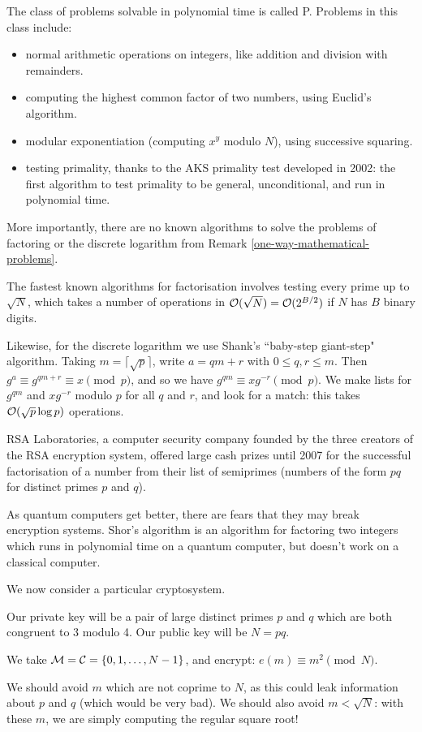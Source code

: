 \documentclass{article}
\begin{document}
\begin{remark}
	\label{polynomial-time-algorithms}
	The class of problems solvable in polynomial time is called P. Problems in this class include:
	\begin{itemize}
		\item normal arithmetic operations on integers, like addition and division with remainders.
		\item computing the highest common factor of two numbers, using Euclid's algorithm.
		\item modular exponentiation (computing $x^y$ modulo $N$), using successive squaring.
		\item testing primality, thanks to the AKS primality test developed in 2002: the first algorithm to test primality to be general, unconditional, and run in polynomial time.
	\end{itemize}
	More importantly, there are no known algorithms to solve the problems of factoring or the discrete logarithm from Remark \ref{one-way-mathematical-problems}.
	
	The fastest known algorithms for factorisation involves testing every prime up to $\sqrt N$, which takes a number of operations in $\mathcal{O}(\sqrt N) = \mathcal{O}(2^{B/2})$ if $N$ has $B$ binary digits.
	
	Likewise, for the discrete logarithm we use Shank's ``baby-step giant-step" algorithm. Taking $m = \lceil \sqrt p \rceil$, write $a = qm + r$ with $0 \leq q, r \leq m$. Then $g^a \equiv g^{qm+r} \equiv x \pmod p$, and so we have $g^{qm} \equiv xg^{-r} \pmod p$. We make lists for $g^{qm}$ and $x g^{-r}$ modulo $p$ for all $q$ and $r$, and look for a match: this takes $\mathcal{O}(\sqrt p \log p)$ operations.
	
	RSA Laboratories, a computer security company founded by the three creators of the RSA encryption system, offered large cash prizes until 2007 for the successful factorisation of a number from their list of semiprimes (numbers of the form $pq$ for distinct primes $p$ and $q$).
	
	As quantum computers get better, there are fears that they may break encryption systems. Shor's algorithm is an algorithm for factoring two integers which runs in polynomial time on a quantum computer, but doesn't work on a classical computer.
\end{remark}

We now consider a particular cryptosystem.

\begin{definition}
    Our private key will be a pair of large distinct primes $p$ and $q$ which are both congruent to 3 modulo 4. Our public key will be $N = pq$.
    
    We take $\mathcal{M} = \mathcal{C} = \left\lbrace 0, 1, \dots, N-1 \right\rbrace$, and encrypt:
	$e(m) \equiv m^2 \pmod N$.
	
	We should avoid $m$ which are not coprime to $N$, as this could leak information about $p$ and $q$ (which would be very bad). We should also avoid $m < \sqrt N$: with these $m$, we are simply computing the regular square root!
\end{definition}
\end{document}
